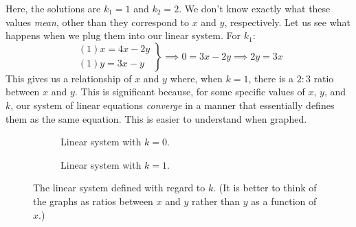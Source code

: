 \documentclass[12pt]{article}
\begin{document}
	Here, the solutions are $k_1 = 1$ and $k_2 = 2$.
	We don't know exactly what these values \textit{mean}, other than they correspond to $x$ and $y$, respectively.
	Let us see what happens when we plug them into our linear system.
	For $k_1$:
	\begin{equation}
		\left. \begin{array}{l}
			(1)x = 4x - 2y \\
			(1)y = 3x - y
		\end{array} \right \}
		\implies 0 = 3x - 2y \implies 2y = 3x
	\end{equation}
	This gives us a relationship of $x$ and $y$ where, when $k = 1$, there is a 
	$2 : 3$ ratio between $x$ and $y$.
	This is significant because, for some specific values of $x$, $y$, and $k$, our system of linear equations \textit{converge} in a manner that essentially defines them as the same equation.
	This is easier to understand when graphed.
	\begin{figure}[h!]
		\centering
		\captionsetup[subfigure]{justification=centering}
		\begin{subfigure}[b]{0.4\textwidth}
			\centering
			\caption{\small Linear system with $k = 0$.}
			\label{fig:sample-eigens0}
		\end{subfigure}
		\qquad
		\begin{subfigure}[b]{0.4\textwidth}
			\centering
		\caption{\small Linear system with $k = 1$.}
		\label{fig:sample-eigens1}
		\end{subfigure}
		\caption{The linear system defined with regard to $k$. (It is better to think of the graphs as ratios between $x$ and $y$ rather than $y$ as a function of $x$.)}
		\label{fig:sample-eigens}
	\end{figure}
\end{document}
